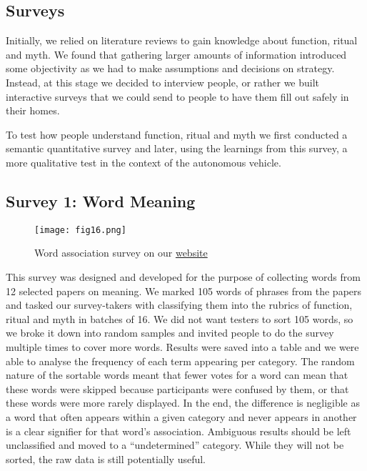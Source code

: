 \documentclass[12pt, usenames, dvipsnames]{report}
\begin{document}
\begin{flushleft}
\chapter{Surveys}

Initially, we relied on literature reviews to gain knowledge about function, ritual and myth.
We found that gathering larger amounts of information introduced some objectivity as we had to make assumptions and decisions on strategy. 
Instead, at this stage we decided to interview people, or rather we built interactive surveys that we could send to people to have them fill out safely in their homes.

To test how people understand function, ritual and myth we first conducted a semantic quantitative survey and later, using the learnings from this survey, a more qualitative test in the context of the autonomous vehicle.


\section{Survey 1: Word Meaning}

\vspace*{1.2em}
\begin{figure}[!htbp]
  \hspace*{-3.666em}
  \texttt{[image: fig16.png]}
  \caption{Word association survey on our \href{https://meaning.pub}{website}}
  \label{fig:figure16}
\end{figure}
\vspace*{1.2em}

This survey was designed and developed for the purpose of collecting words from 12 selected papers on meaning. 
We marked 105 words of phrases from the papers and tasked our survey-takers with classifying them into the rubrics of function, ritual and myth in batches of 16.
We did not want testers to sort 105 words, so we broke it down into random samples and invited people to do the survey multiple times to cover more words.
Results were saved into a table and we were able to analyse the frequency of each term appearing per category.
The random nature of the sortable words meant that fewer votes for a word can mean that these words were skipped because participants were confused by them, or that these words were more rarely displayed.
In the end, the difference is negligible as a word that often appears within a given category and never appears in another is a clear signifier for that word's association.
Ambiguous results should be left unclassified and moved to a ``undetermined'' category.
While they will not be sorted, the raw data is still potentially useful.


\end{flushleft}
\end{document}
